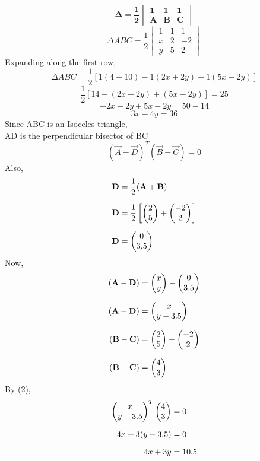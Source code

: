 \documentclass[journal,12pt,twocolumn]{IEEEtran}
\begin{document}
$$ \label{eq:area_tri}
\mathbf{\Delta =\frac{1}{2}\begin{vmatrix}
1 & 1 & 1\\ 
A & B & C
\end{vmatrix}}$$
$$\Delta ABC=\frac{1}{2}\begin{vmatrix}
1 & 1 & 1\\ 
x & 2 & -2\\ 
y & 5 & 2
\end{vmatrix}$$
Expanding along the first row,\\
$$\Delta ABC=\frac{1}{2}\left [ 1(4+10)-1(2x+2y)+1(5x-2y) \right ]$$
$$\frac{1}{2}\left [14-(2x+2y)+(5x-2y) \right ]=25$$
$$-2x-2y+5x-2y=50-14$$
\begin{equation}
 3x-4y=36    
\end{equation}
\noindent
Since ABC is an Isoceles triangle, \\ AD is the perpendicular bisector of BC
\begin{equation}
 (\vec{A}-\vec{D})^T (\vec{B}-\vec{C})=0
\end{equation}
Also,
\begin{align*}
    \mathbf{D} &=\frac{1}{2}(\mathbf{A}+\mathbf{B}) \\[6pt]
    \mathbf{D} &=\frac{1}{2}\left[ \begin{pmatrix}2\\5\end{pmatrix} + \begin{pmatrix}-2\\2\end{pmatrix}\right] \\[6pt]
    \mathbf{D} &=\begin{pmatrix}0\\3.5\end{pmatrix} 
\end{align*}
Now,
\begin{align*}
    (\mathbf{A}-\mathbf{D}) &= \begin{pmatrix}x\\y\end{pmatrix}- \begin{pmatrix}0\\3.5\end{pmatrix} \\[6pt]
    (\mathbf{A}-\mathbf{D}) &= \begin{pmatrix}x\\y-3.5\end{pmatrix} \\[6pt]
    (\mathbf{B}-\mathbf{C}) &= \begin{pmatrix}2\\5\end{pmatrix}- \begin{pmatrix}-2\\2\end{pmatrix} \\[6pt]
    (\mathbf{B}-\mathbf{C}) &= \begin{pmatrix}4\\3\end{pmatrix}
\end{align*}
By (2),
\begin{align*}
{\ensuremath{\begin{pmatrix}x\\y-3.5\end{pmatrix}}}^T \begin{pmatrix}4\\3\end{pmatrix} &= 0 \\[6pt]
    4x+3(y-3.5) &= 0 \\[6pt]
    4x+3y &= 10.5
\end{align*}
\end{document}
